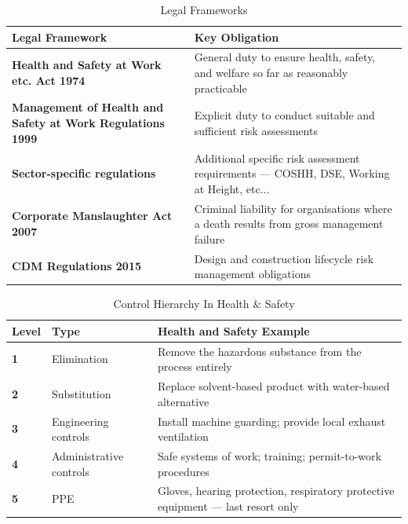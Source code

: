 \begin{table}[H]
  \centering
  \renewcommand{\arraystretch}{1.5}
  \begin{tabularx}{\textwidth}{ | >{\raggedright\arraybackslash}p{} 
                                | >{\raggedright\arraybackslash}X | }
    \hline
    \textbf{Legal Framework} & \textbf{Key Obligation} \\
    \hline
    \textbf{Health and Safety at Work etc. Act 1974} & General duty to ensure health, safety, and welfare so far as reasonably practicable\\
    \hline
    \textbf{Management of Health and Safety at Work Regulations 1999} & Explicit duty to conduct suitable and sufficient risk assessments\\
    \hline
    \textbf{Sector-specific regulations} & Additional specific risk assessment requirements — COSHH, DSE, Working at Height, etc...\\
    \hline
    \textbf{Corporate Manslaughter Act 2007} & Criminal liability for organisations where a death results from gross management failure\\
    \hline
    \textbf{CDM Regulations 2015} & Design and construction lifecycle risk management obligations\\
    \hline
  \end{tabularx}
  \caption{Legal Frameworks}
\end{table}

\begin{table}[H]
  \centering
  \renewcommand{\arraystretch}{1.5}
  \begin{tabularx}{\textwidth}{ | >{\raggedright\arraybackslash}p{} 
								| >{\raggedright\arraybackslash}p{} 
                                | >{\raggedright\arraybackslash}X | }
    \hline
    \textbf{Level} & \textbf{Type} & \textbf{Health and Safety Example} \\
    \hline
    \textbf{1} & Elimination & Remove the hazardous substance from the process entirely\\
    \hline
    \textbf{2} & Substitution & Replace solvent-based product with water-based alternative\\
    \hline
    \textbf{3} & Engineering controls & Install machine guarding; provide local exhaust ventilation\\
    \hline
    \textbf{4} & Administrative controls & Safe systems of work; training; permit-to-work procedures\\
    \hline
    \textbf{5} & PPE & Gloves, hearing protection, respiratory protective equipment — last resort only\\
    \hline
  \end{tabularx}
  \caption{Control Hierarchy In Health \& Safety}
\end{table}

